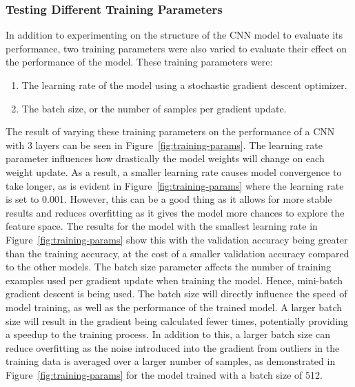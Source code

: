 \documentclass[a4paper]{article}
\begin{document}
\subsubsection{Testing Different Training Parameters}
In addition to experimenting on the structure of the CNN model to evaluate its performance, two training parameters were also varied to evaluate their effect on the performance of the model. These training parameters were:
\begin{enumerate}
    \item The learning rate of the model using a stochastic gradient descent optimizer.
    \item The batch size, or the number of samples per gradient update.
\end{enumerate}
The result of varying these training parameters on the performance of a CNN with 3 layers can be seen in Figure~\ref{fig:training-params}. The learning rate parameter influences how drastically the model weights will change on each weight update. As a result, a smaller learning rate causes model convergence to take longer, as is evident in Figure~\ref{fig:training-params} where the learning rate is set to 0.001. However, this can be a good thing as it allows for more stable results and reduces overfitting as it gives the model more chances to explore the feature space. The results for the model with the smallest learning rate in Figure~\ref{fig:training-params} show this with the validation accuracy being greater than the training accuracy, at the cost of a smaller validation accuracy compared to the other models. The batch size parameter affects the number of training examples used per gradient update when training the model. Hence, mini-batch gradient descent is being used. The batch size will directly influence the speed of model training, as well as the performance of the trained model. A larger batch size will result in the gradient being calculated fewer times, potentially providing a speedup to the training process. In addition to this, a larger batch size can reduce overfitting as the noise introduced into the gradient from outliers in the training data is averaged over a larger number of samples, as demonstrated in Figure~\ref{fig:training-params} for the model trained with a batch size of 512.
\end{document}
